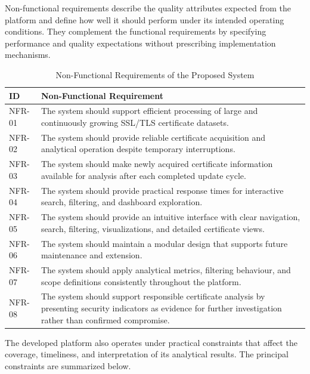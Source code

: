Non-functional requirements describe the quality attributes expected from the
platform and define how well it should perform under its intended operating
conditions. They complement the functional requirements by specifying
performance and quality expectations without prescribing implementation
mechanisms.

\begin{table}[H]
  \centering
  \footnotesize
  \setlength{\tabcolsep}{4pt}
  \renewcommand{\arraystretch}{1.05}
  \caption{Non-Functional Requirements of the Proposed System}
  \label{tab:derived-quality-attributes}
  \begin{tabularx}{\textwidth}{@{}>{\Centering\arraybackslash}p{}Y@{}}
    \toprule
    \textbf{ID} & \textbf{Non-Functional Requirement} \\
    \midrule
    NFR-01 & The system should support efficient processing of large and continuously growing SSL/TLS certificate datasets. \\
    NFR-02 & The system should provide reliable certificate acquisition and analytical operation despite temporary interruptions. \\
    NFR-03 & The system should make newly acquired certificate information available for analysis after each completed update cycle. \\
    NFR-04 & The system should provide practical response times for interactive search, filtering, and dashboard exploration. \\
    NFR-05 & The system should provide an intuitive interface with clear navigation, search, filtering, visualizations, and detailed certificate views. \\
    NFR-06 & The system should maintain a modular design that supports future maintenance and extension. \\
    NFR-07 & The system should apply analytical metrics, filtering behaviour, and scope definitions consistently throughout the platform. \\
    NFR-08 & The system should support responsible certificate analysis by presenting security indicators as evidence for further investigation rather than confirmed compromise. \\
    \bottomrule
  \end{tabularx}
\end{table}

The developed platform also operates under practical constraints that affect
the coverage, timeliness, and interpretation of its analytical results. The
principal constraints are summarized below.

